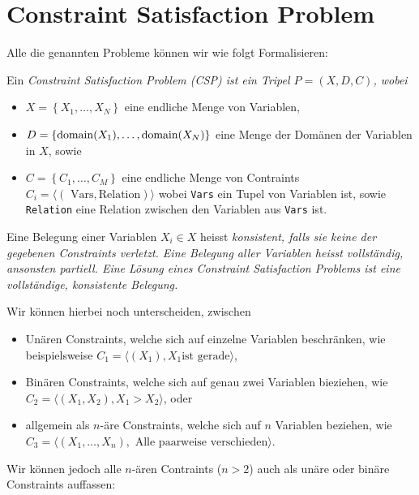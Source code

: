 \section{Constraint Satisfaction Problem}
Alle die genannten Probleme können wir wie folgt Formalisieren:
\begin{definition}
	Ein \em Constraint Satisfaction Problem \em (CSP) ist ein Tripel $P=\left(X,D,C\right)$, wobei
	\begin{itemize}
	\item $X = \left\{X_1, \dots, X_N\right\}$ eine endliche Menge von Variablen,
	\item $D = \left\{\operatorname{domain}(X_1),\dots, \operatorname{domain}(X_N)\right\}$ eine Menge der Domänen der Variablen in $X$, sowie
	\item $C = \left\{C_1,\dots,C_M\right\}$ eine endliche Menge von Contraints $C_i = \langle\left(\text{ Vars}, \text{Relation}\right)\rangle$ wobei \texttt{Vars} ein Tupel von Variablen ist, 	sowie \texttt{Relation} eine Relation zwischen den Variablen aus \texttt{Vars} ist.
	\end{itemize}
	Eine Belegung einer Variablen $X_i \in X$ heisst \em konsistent\em, falls sie keine der gegebenen Constraints verletzt. Eine Belegung aller Variablen heisst \em vollständig\em, ansonsten \em partiell\em. Eine Lösung eines Constraint Satisfaction Problems ist eine vollständige, konsistente Belegung.
\end{definition}
Wir können hierbei noch unterscheiden, zwischen
\begin{itemize}
	\item Unären Constraints, welche sich auf einzelne Variablen beschränken, wie beispielsweise $C_1 = \langle (X_1),X_1 \text{ist gerade}\rangle$,
	\item Binären Constraints, welche sich auf genau zwei Variablen bieziehen, wie $C_2 = \langle(X_1,X_2),X_1>X_2\rangle$, oder
	\item allgemein als $n$-äre Constraints, welche sich auf $n$ Variablen beziehen, wie $C_3 = \langle(X_1,\dots,X_n),\text{ Alle paarweise verschieden}\rangle$.
\end{itemize}

Wir können jedoch alle $n$-ären Contraints ($n>2$) auch als unäre oder binäre Constraints auffassen:

